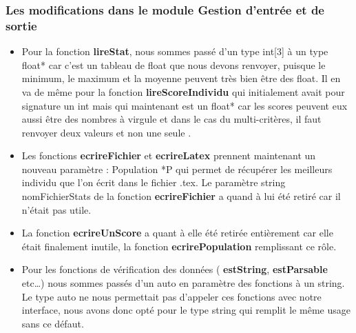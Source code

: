 \documentclass[a4paper,11pt]{article}
\begin{document}
   			\subsubsection{Les modifications dans le module Gestion d’entrée et de sortie}
   				\begin{itemize}
   					\item Pour la fonction  \textbf{lireStat}, nous sommes passé d’un type int[3] à un type float* car c’est un tableau de float que nous devons renvoyer, puisque le minimum, le maximum et la moyenne peuvent très bien être des float.
   					Il en va de même pour la fonction  \textbf{lireScoreIndividu} qui initialement avait pour signature un int mais qui maintenant est un float* car les scores peuvent eux aussi être des nombres à virgule et dans le cas du multi-critères, il faut renvoyer deux valeurs et non une seule .

   					\item Les fonctions  \textbf{ecrireFichier} et  \textbf{ecrireLatex} prennent maintenant un nouveau paramètre : Population *P qui permet de récupérer les meilleurs individu que l’on écrit dans le fichier .tex. Le paramètre string nomFichierStats de la fonction  \textbf{ecrireFichier} a quand à lui été retiré car il n'était pas utile.
   					\item La fonction  \textbf{ecrireUnScore} a quant à elle été retirée entièrement car elle était finalement inutile, la fonction  \textbf{ecrirePopulation} remplissant ce rôle.

   					\item Pour les fonctions de vérification des données ( \textbf{estString},  \textbf{estParsable} etc…) nous sommes passés d’un auto en paramètre des fonctions à un string. Le type auto ne nous permettait pas d'appeler ces fonctions avec notre interface, nous avons donc opté pour le type string qui remplit le même usage sans ce défaut.
   				\end{itemize}
\end{document}
